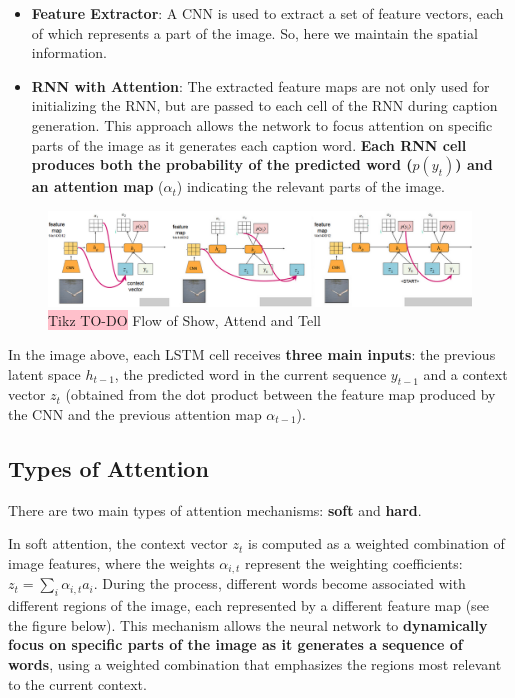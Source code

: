 \begin{itemize}
    \item \textbf{Feature Extractor}: A CNN is used to extract a set of feature vectors, each of which represents a part of the image. So, here we maintain the spatial information.
    \item \textbf{RNN with Attention}: The extracted feature maps are not only used for initializing the RNN, but are passed to each cell of the RNN during caption generation. This approach allows the network to focus attention on specific parts of the image as it generates each caption word. \textbf{Each RNN cell produces both the probability of the predicted word ($p(y_t)$) and an attention map }($\alpha_t$) indicating the relevant parts of the image.
\end{itemize}

\begin{figure}[!htbp]
    \centering
    \includegraphics[width=1\linewidth]{tikz/chapter7 - Attention Model.png}
    \caption{{\color{red}\colorbox{pink}{Tikz TO-DO}}  Flow of Show, Attend and Tell}
\end{figure}

In the image above, each LSTM cell receives \textbf{three main inputs}: the previous latent space $h_{t-1}$, the predicted word in the current sequence $ y_{t-1} $ and a context vector $ z_{t} $ (obtained from the dot product between the feature map produced by the CNN and the previous attention map $\alpha_{t-1}$). 

\subsection{Types of Attention}

There are two main types of attention mechanisms: \textbf{soft} and \textbf{hard}.

In soft attention, the context vector $z_t$ is computed as a weighted combination of image features, where the weights $\alpha_{i,t}$ represent the weighting coefficients: $z_t = \sum_{i}\alpha_{i,t}a_i$.  During the process, different words become associated with different regions of the image, each represented by a different feature map (see the figure below). This mechanism allows the neural network to \textbf{dynamically focus on specific parts of the image as it generates a sequence of words}, using a weighted combination that emphasizes the regions most relevant to the current context.

